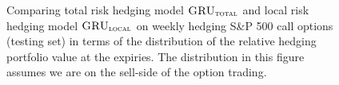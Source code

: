 \documentclass[letterpaper,12pt,titlepage,oneside,final]{book}
\numberwithin{equation}{section}
\theoremstyle{definition}
\newcommand{\modelT}{\textsc{GRU}_{\textsc{total}}}
\newcommand{\modelL}{\textsc{GRU}_{\textsc{local}}}
\begin{document}
\begin{figure}[htp!]
	\centering
	\caption{Comparing total risk hedging model $\modelT$ and local risk hedging model $\modelL$ on weekly hedging S\&P 500 call options (testing set) in terms of the distribution of the  relative hedging portfolio value at the expiries. The distribution in this figure assumes we are on the sell-side of the option trading.} \label{fig:CallTotalW1}
	\centering

\end{figure}
\end{document}
